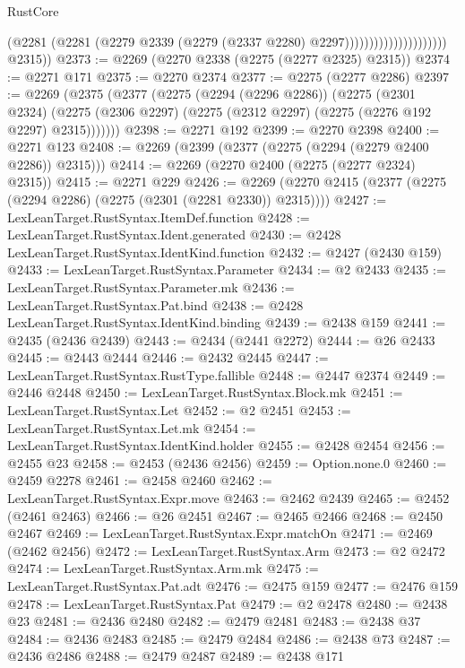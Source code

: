 \begin{lexlean}{RustCore}
\begin{coremodule}
                                          (@2281
                                            (@2281
                                              (@2279
                                                @2339
                                                (@2279 (@2337 @2280) @2297)))))))))))))))))))))
        @2315))
@2373 := @2269 (@2270 @2338 (@2275 (@2277 @2325) @2315))
@2374 := @2271 @171
@2375 := @2270 @2374
@2377 := @2275 (@2277 @2286)
@2397 := @2269
    (@2375
      (@2377
        (@2275
          (@2294 (@2296 @2286))
          (@2275
            (@2301 @2324)
            (@2275 (@2306 @2297) (@2275 (@2312 @2297) (@2275 (@2276 @192 @2297) @2315)))))))
@2398 := @2271 @192
@2399 := @2270 @2398
@2400 := @2271 @123
@2408 := @2269 (@2399 (@2377 (@2275 (@2294 (@2279 @2400 @2286)) @2315)))
@2414 := @2269 (@2270 @2400 (@2275 (@2277 @2324) @2315))
@2415 := @2271 @229
@2426 := @2269 (@2270 @2415 (@2377 (@2275 (@2294 @2286) (@2275 (@2301 (@2281 @2330)) @2315))))
@2427 := LexLeanTarget.RustSyntax.ItemDef.function
@2428 := LexLeanTarget.RustSyntax.Ident.generated
@2430 := @2428 LexLeanTarget.RustSyntax.IdentKind.function
@2432 := @2427 (@2430 @159)
@2433 := LexLeanTarget.RustSyntax.Parameter
@2434 := @2 @2433
@2435 := LexLeanTarget.RustSyntax.Parameter.mk
@2436 := LexLeanTarget.RustSyntax.Pat.bind
@2438 := @2428 LexLeanTarget.RustSyntax.IdentKind.binding
@2439 := @2438 @159
@2441 := @2435 (@2436 @2439)
@2443 := @2434 (@2441 @2272)
@2444 := @26 @2433
@2445 := @2443 @2444
@2446 := @2432 @2445
@2447 := LexLeanTarget.RustSyntax.RustType.fallible
@2448 := @2447 @2374
@2449 := @2446 @2448
@2450 := LexLeanTarget.RustSyntax.Block.mk
@2451 := LexLeanTarget.RustSyntax.Let
@2452 := @2 @2451
@2453 := LexLeanTarget.RustSyntax.Let.mk
@2454 := LexLeanTarget.RustSyntax.IdentKind.holder
@2455 := @2428 @2454
@2456 := @2455 @23
@2458 := @2453 (@2436 @2456)
@2459 := Option.none.{0}
@2460 := @2459 @2278
@2461 := @2458 @2460
@2462 := LexLeanTarget.RustSyntax.Expr.move
@2463 := @2462 @2439
@2465 := @2452 (@2461 @2463)
@2466 := @26 @2451
@2467 := @2465 @2466
@2468 := @2450 @2467
@2469 := LexLeanTarget.RustSyntax.Expr.matchOn
@2471 := @2469 (@2462 @2456)
@2472 := LexLeanTarget.RustSyntax.Arm
@2473 := @2 @2472
@2474 := LexLeanTarget.RustSyntax.Arm.mk
@2475 := LexLeanTarget.RustSyntax.Pat.adt
@2476 := @2475 @159
@2477 := @2476 @159
@2478 := LexLeanTarget.RustSyntax.Pat
@2479 := @2 @2478
@2480 := @2438 @23
@2481 := @2436 @2480
@2482 := @2479 @2481
@2483 := @2438 @37
@2484 := @2436 @2483
@2485 := @2479 @2484
@2486 := @2438 @73
@2487 := @2436 @2486
@2488 := @2479 @2487
@2489 := @2438 @171

\end{coremodule}
\end{lexlean}
